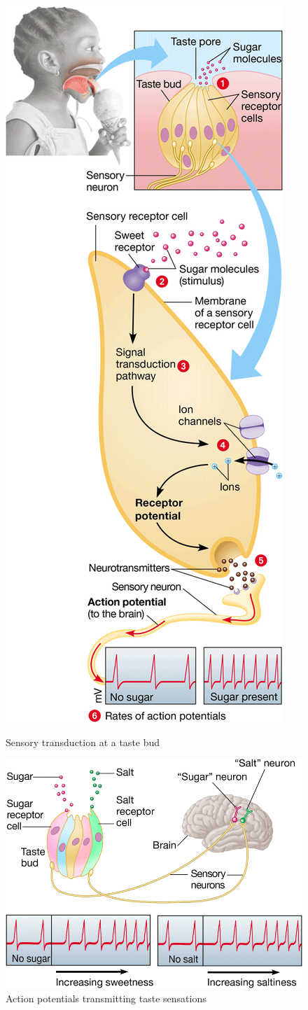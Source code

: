 \documentclass{article}
\begin{document}
\begin{figure}[h]
	\centering
	\begin{minipage}{.5\textwidth}
		\centering
		\includegraphics[height=\linewidth]{sugar_perception_a.png}
		\caption{Sensory transduction at a taste bud}
	\end{minipage}%
	\begin{minipage}{.5\textwidth}
		\centering
		\includegraphics[width=\linewidth]{sugar_perception_b.png}
		\caption{Action potentials transmitting taste sensations}
	\end{minipage}
\end{figure}
\end{document}
